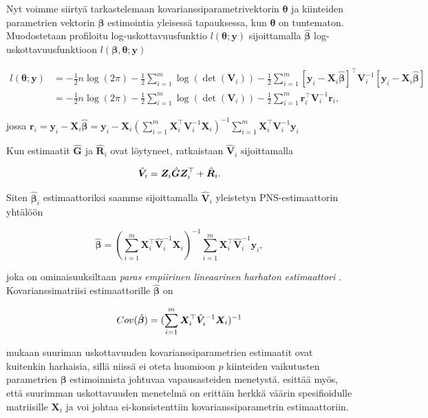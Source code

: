 \documentclass[finnish]{docopts}
\begin{document}
Nyt voimme siirtyä tarkastelemaan kovarianssiparametrivektorin $\bm{\theta}$ ja kiinteiden parametrien vektorin $\bm{\beta}$ estimointia yleisessä tapauksessa, kun $\bm{\theta}$ on tuntematon.\\

Muodostetaan profiloitu log-uskottavuusfunktio $l(\bm{\theta} ; \bm{y})$ sijoittamalla $\hat{\bm{\beta}}$ log-uskottavuusfunktioon $l(\bm{\beta}, \bm{\theta};\bm{y})$

$$
\begin{aligned}
l(\bm{\theta};\bm{y}) &= -\frac{1}{2} n \log (2\pi) -\frac{1}{2} \sum\limits_{i=1}^{m} \log (\det (\bm{V}_i)) -\frac{1}{2} \sum\limits_{i=1}^{m} [\bm{y}_i - \bm{X}_i \hat{\bm{\beta}}]^\top \bm{V}_i^{-1} [\bm{y}_i - \bm{X}_i \hat{\bm{\beta}}] \\
&= -\frac{1}{2} n \log (2\pi) -\frac{1}{2} \sum\limits_{i=1}^{m} \log (\det (\bm{V}_i)) -\frac{1}{2} \sum\limits_{i=1}^{m} \bm{r}_{i}^\top \bm{V}_i^{-1} \bm{r}_{i},
\end{aligned}
$$

jossa $\bm{r}_i = \bm{y}_i - \bm{X}_i \hat{\bm{\beta}} = \bm{y}_i - \bm{X}_i (\sum\limits_{i=1}^{m} \bm{X}_{i}^\top \bm{V}_i^{-1} \bm{X}_{i})^{-1} \sum\limits_{i=1}^{m} \bm{X}_{i}^\top \bm{V}_i^{-1} \bm{y}_i$

Kun estimaatit $\hat{\bm{G}}$ ja $\hat{\bm{R}}_i$ ovat löytyneet, ratkaistaan $\hat{\bm{V}}_i$ sijoittamalla

$$
\hat{\bm{V}}_i = \bm{Z}_i \hat{\bm{G}} \bm{Z}^\top_i + \hat{\bm{R}}_i \\.
$$

Siten $\hat{\bm{\beta}}_i$ estimaattoriksi saamme sijoittamalla $\hat{\bm{V}}_i$ yleistetyn PNS-estimaattorin yhtälöön

$$
\hat{\bm{\beta}} =  (\sum\limits_{i=1}^{m} \bm{X}_{i}^\top \hat{\bm{V}}_i^{-1} \bm{X}_{i})^{-1} \sum\limits_{i=1}^{m} \bm{X}_{i}^\top \hat{\bm{V}}_i^{-1} \bm{y}_i,
$$

joka on ominaisuuksiltaan \textit{paras empiirinen lineaarinen harhaton estimaattori} \cite{west14}. \\

Kovarianssimatriisi estimaattorille $\hat{\bm{\beta}}$ on

$$
Cov(\hat{\bm{\beta}}) = (\sum\limits_{i=1}^{m} \bm{X}_{i}^\top \hat{\bm{V}}_i^{-1} \bm{X}_{i})^{-1} \\
$$

\cite{west14} mukaan suuriman uskottavuuden kovarianssiparametrien estimaatit ovat kuitenkin harhaisia, sillä niissä ei oteta huomioon $p$ kiinteiden vaikutusten parametrien $\bm{\beta}$ estimoinnista johtuvaa vapausasteiden menetystä. \cite{diggle02} esittää myös, että suurimman uskottavuuden menetelmä on erittäin herkkä väärin spesifioidulle matriisille $\bm{X}_{i}$ ja voi johtaa ei-konsistenttiin kovarianssiparametrin estimaattoriin.\\
\end{document}
